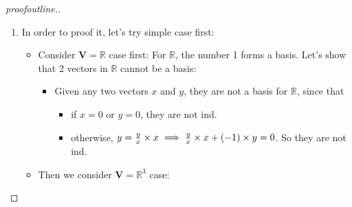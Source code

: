 \begin{proof}[proofoutline.]
\begin{enumerate}
\item
In order to proof it, let's try simple case first:
\begin{itemize}
\item
Consider $\bm V = \mathbb{R}$ case first:
For $\mathbb{R}$, the number 1 forms a basis. Let's show that 2 vectors in $\mathbb{R}$ cannot be a basis:
\begin{itemize}
\item
Given any two vectors $x$ and $y$, they are not a basis for $\mathbb{R}$, since that
\begin{itemize}
\item
if $x=0$ or $y=0$, they are not ind.
\item
otherwise, $y = \frac{y}{x}\times x\implies \frac{y}{x}\times x + (-1)\times y = 0$. So they are not ind.
\end{itemize}
\end{itemize}
\item
Then we consider $\bm V = \mathbb{R}^3$ case:


\end{itemize}
\end{enumerate}
\end{proof}
